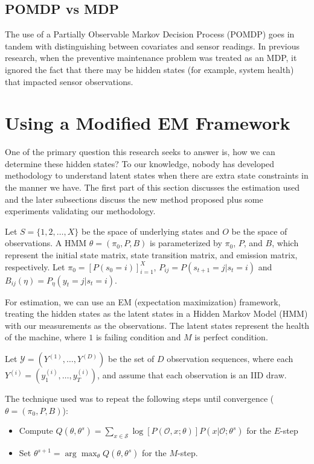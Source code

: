 \documentclass[english]{article}
\numberwithin{equation}{section}
\begin{document}
	\subsection*{POMDP vs MDP}
	The use of a Partially Observable Markov Decision Process (POMDP) goes in tandem with distinguishing between covariates and sensor readings. In previous research, when the preventive maintenance problem was treated as an MDP, it ignored the fact that there may be hidden states (for example, system health) that impacted sensor observations.
	
	\section*{Using a Modified EM Framework}
	One of the primary question this research seeks to answer is, how we can determine these hidden states? To our knowledge, nobody has developed methodology to understand latent states when there are extra state constraints in the manner we have. The first part of this section discusses the estimation used and the later subsections discuss the new method proposed plus some experiments validating our methodology.
	
	Let $S=\{1,2,\ldots,X\}$ be the space of underlying states and $O$ be the space of observations. A HMM $\theta=(\pi_0,P,B)$ is parameterized by $\pi_0$, $P$, and $B$, which represent the initial state matrix, state transition matrix, and emission matrix, respectively. Let $\pi_0=[P(s_0=i)]_{i=1}^X$, $P_{ij}=P(s_{t+1}=j|s_t=i)$ and $B_{ij}(\eta)=P_{\eta}(y_t=j|s_t=i)$.
	
	
	For estimation, we can use an EM (expectation maximization) framework, treating the hidden states as the latent states in a Hidden Markov Model (HMM) with our measurements as the observations. The latent states represent the health of the machine, where $1$ is failing condition and $M$ is perfect condition.
	
	Let $\mathcal{Y} = (Y^{(1)},\ldots,Y^{(D)})$ be the set of $D$ observation sequences, where each $Y^{(i)}=(y_1^{(i)},\ldots,y_{T}^{(i)})$, and assume that each observation is an IID draw.

	The technique used was to repeat the following steps until convergence ($\theta = (\pi_0,P,B)$):
	\begin{itemize}
		\item Compute $Q(\theta,\theta^s) = \sum_{x\in \mathcal{S}} \log [P(\mathcal{O},x;\theta)]P(x|\mathcal{O};\theta^s)$ for the $E$-step
		\item Set $\theta^{s+1} = \arg \max_{\theta} Q(\theta, \theta^s)$ for the $M$-step.
	\end{itemize}
	
\end{document}
